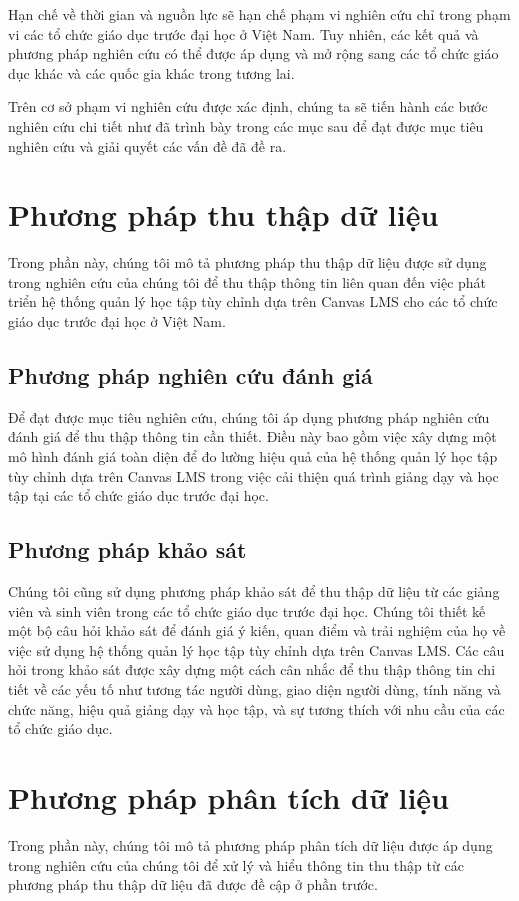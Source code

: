 \documentclass[../Thesis.tex]{subfiles}
\begin{document}
    Hạn chế về thời gian và nguồn lực sẽ hạn chế phạm vi nghiên cứu chỉ trong phạm vi các tổ chức giáo dục trước đại học ở Việt Nam. Tuy nhiên, các kết quả và phương pháp nghiên cứu có thể được áp dụng và mở rộng sang các tổ chức giáo dục khác và các quốc gia khác trong tương lai.

    Trên cơ sở phạm vi nghiên cứu được xác định, chúng ta sẽ tiến hành các bước nghiên cứu chi tiết như đã trình bày trong các mục sau để đạt được mục tiêu nghiên cứu và giải quyết các vấn đề đã đề ra.
\section{Phương pháp thu thập dữ liệu}
Trong phần này, chúng tôi mô tả phương pháp thu thập dữ liệu được sử dụng trong nghiên cứu của chúng tôi để thu thập thông tin liên quan đến việc phát triển hệ thống quản lý học tập tùy chỉnh dựa trên Canvas LMS cho các tổ chức giáo dục trước đại học ở Việt Nam.
    \subsection{Phương pháp nghiên cứu đánh giá}
    Để đạt được mục tiêu nghiên cứu, chúng tôi áp dụng phương pháp nghiên cứu đánh giá để thu thập thông tin cần thiết. Điều này bao gồm việc xây dựng một mô hình đánh giá toàn diện để đo lường hiệu quả của hệ thống quản lý học tập tùy chỉnh dựa trên Canvas LMS trong việc cải thiện quá trình giảng dạy và học tập tại các tổ chức giáo dục trước đại học.
    \subsection{Phương pháp khảo sát}
    Chúng tôi cũng sử dụng phương pháp khảo sát để thu thập dữ liệu từ các giảng viên và sinh viên trong các tổ chức giáo dục trước đại học. Chúng tôi thiết kế một bộ câu hỏi khảo sát để đánh giá ý kiến, quan điểm và trải nghiệm của họ về việc sử dụng hệ thống quản lý học tập tùy chỉnh dựa trên Canvas LMS. Các câu hỏi trong khảo sát được xây dựng một cách cân nhắc để thu thập thông tin chi tiết về các yếu tố như tương tác người dùng, giao diện người dùng, tính năng và chức năng, hiệu quả giảng dạy và học tập, và sự tương thích với nhu cầu của các tổ chức giáo dục.
\section{Phương pháp phân tích dữ liệu}
Trong phần này, chúng tôi mô tả phương pháp phân tích dữ liệu được áp dụng trong nghiên cứu của chúng tôi để xử lý và hiểu thông tin thu thập từ các phương pháp thu thập dữ liệu đã được đề cập ở phần trước.
\end{document}
